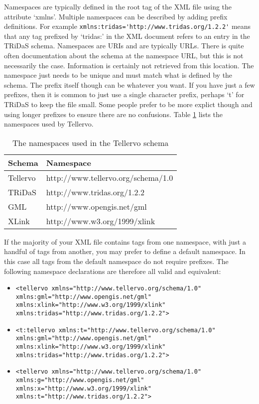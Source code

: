 Namespaces are typically defined in the root tag of the XML file using the attribute `xmlns'.  Multiple namespaces can be described by adding prefix definitions.  For example \lstinline$xmlns:tridas='http://www.tridas.org/1.2.2'$ means that any tag prefixed by `tridas:' in the XML document refers to an entry in the TRiDaS schema.  Namespaces are URIs and are typically URLs.  There is quite often documentation about the schema at the namespace URL, but this is not necessarily the case.  Information is certainly not retrieved from this location.  The namespace just needs to be unique and must match what is defined by the schema.  The prefix itself though can be whatever you want.  If you have just a few prefixes, then it is common to just use a single character prefix, perhaps `t' for TRiDaS to keep the file small.  Some people prefer to be more explict though and using longer prefixes to ensure there are no confusions.  Table \ref{tbl:namespaces} lists the namespaces used by Tellervo.


\begin{table}
\label{tbl:namespaces}
\begin{center}
\begin{tabular}{ll}

\toprule
Schema & Namespace \\
\midrule
Tellervo & http://www.tellervo.org/schema/1.0\\
TRiDaS & http://www.tridas.org/1.2.2\\
GML & http://www.opengis.net/gml\\
XLink & http://www.w3.org/1999/xlink\\
\bottomrule
\end{tabular}
\caption{The namespaces used in the Tellervo schema}
\end{center}
\end{table}


If the majority of your XML file contains tags from one namespace, with just a handful of tags from another, you may prefer to define a default namespace.  In this case all tags from the default namespace do not require prefixes.  The following namespace declarations are therefore all valid and equivalent:

\begin{itemize}
 \item \lstinline$<tellervo xmlns="http://www.tellervo.org/schema/1.0" xmlns:gml="http://www.opengis.net/gml" $ \\ 
  \lstinline$xmlns:xlink="http://www.w3.org/1999/xlink" xmlns:tridas="http://www.tridas.org/1.2.2">$
 \item \lstinline$<t:tellervo xmlns:t="http://www.tellervo.org/schema/1.0" xmlns:gml="http://www.opengis.net/gml" $ \\   \lstinline$xmlns:xlink="http://www.w3.org/1999/xlink" xmlns:tridas="http://www.tridas.org/1.2.2">$
 \item \lstinline$<tellervo xmlns="http://www.tellervo.org/schema/1.0" xmlns:g="http://www.opengis.net/gml" $ \\   \lstinline$xmlns:x="http://www.w3.org/1999/xlink" xmlns:t="http://www.tridas.org/1.2.2">$
\end{itemize}


